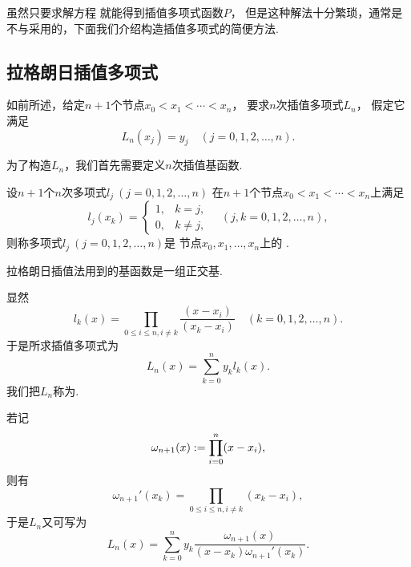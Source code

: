虽然只要求解方程  就能得到插值多项式函数\(P\)，
但是这种解法十分繁琐，通常是不与采用的，下面我们介绍构造插值多项式的简便方法.

\subsection{拉格朗日插值多项式}
如前所述，给定\(n+1\)个节点\(x_0 < x_1 < \dotsb < x_n\)，
要求\(n\)次插值多项式\(L_n\)，
假定它满足\begin{equation*}
	L_n(x_j) = y_j
	\quad(j=0,1,2,\dotsc,n).
\end{equation*}

为了构造\(L_n\)，我们首先需要定义\(n\)次插值基函数.
\begin{definition}
设\(n+1\)个\(n\)次多项式\(l_j\ (j=0,1,2,\dotsc,n)\)
在\(n+1\)个节点\(x_0 < x_1 < \dotsb < x_n\)上满足\begin{equation*}
	l_j(x_k) = \begin{cases}
		1, & k=j, \\
		0, & k \neq j,
	\end{cases}
	\quad(j,k=0,1,2,\dotsc,n),
\end{equation*}
则称多项式\(l_j\ (j=0,1,2,\dotsc,n)\)是
节点\(x_0,x_1,\dotsc,x_n\)上的
.
\end{definition}
\begin{remark}
拉格朗日插值法用到的基函数是一组正交基.
\end{remark}

显然\begin{equation}
	l_k(x)
	= \prod_{0 \leq i \leq n, i \neq k} \frac{(x - x_i)}{(x_k - x_i)}
	\quad(k=0,1,2,\dotsc,n).
\end{equation}
于是所求插值多项式为\begin{equation}
	L_n(x)
	= \sum_{k=0}^n y_k l_k(x).
\end{equation}
我们把\(L_n\)称为.

若记\begin{equation}
	\omega_{n+1}(x)
	:=
	\prod_{i=0}^n (x - x_i),
\end{equation}
则有\begin{equation*}
	\omega_{n+1}'(x_k)
	= \prod_{0 \leq i \leq n, i \neq k} (x_k - x_i),
\end{equation*}
于是\(L_n\)又可写为\begin{equation}
	L_n(x) = \sum_{k=0}^n y_k \frac{\omega_{n+1}(x)}{(x - x_k) \omega_{n+1}'(x_k)}.
\end{equation}

